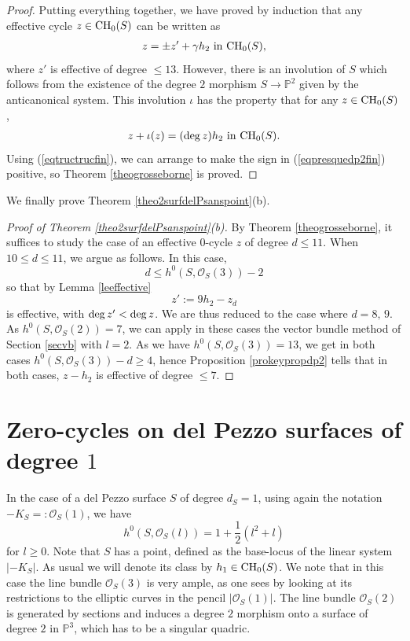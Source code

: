 \documentclass[10pt]{article}
\begin{document}
\begin{proof}
Putting everything together, we have proved  by induction that any effective cycle $z\in {\rm CH}_0(S)$ can be written
as
\begin{eqnarray}\label{eqpresquedp2fin} z=\pm z'+\gamma h_2\,\,{\rm in}\,\,{\rm CH}_0(S), \end{eqnarray} where $z'$ is effective of degree $\leq 13$. However, there is an involution of $S$ which follows from the existence of the  degree $2$  morphism  $S\rightarrow \mathbb{P}^2$ given by the anticanonical system. This  involution $\iota$ has the property that for any $z\in {\rm CH}_0(S)$,
\begin{eqnarray}\label{eqtructrucfin} z+\iota(z)=({\rm deg}\,z)h_2
\,\,{\rm in}\,\,{\rm CH}_0(S).
\end{eqnarray}
Using (\ref{eqtructrucfin}), we can arrange to make the sign in (\ref{eqpresquedp2fin}) positive, so
Theorem \ref{theogrosseborne} is proved.
\end{proof}

We finally prove Theorem \ref{theo2surfdelPsanspoint}(b).
\begin{proof}[Proof of Theorem \ref{theo2surfdelPsanspoint}(b)] By Theorem \ref{theogrosseborne}, it suffices to study the case of  an effective $0$-cycle $z$ of degree $d\leq 11$. When  $10\leq d\leq11$, we argue as follows. In this case,
$$d\leq h^0(S,\mathcal{O}_S(3))-2$$
so that by  Lemma \ref{leeffective}
$$ z':=9h_2-z_d$$
is effective, with ${\rm deg}\,z'<{\rm deg}\,z$. We are thus reduced to the case where $d=8,\,9$. As $h^0(S,\mathcal{O}_S(2))=7$, we can apply in these cases the vector bundle method of Section \ref{secvb} with $l=2$. As we have $h^0(S,\mathcal{O}_S(3))=13$, we get in both cases $h^0(S,\mathcal{O}_S(3))-d\geq 4$, hence Proposition \ref{prokeypropdp2} tells that in both cases, $z-h_2$ is effective of degree $\leq 7$.
\end{proof}



\section{Zero-cycles on del Pezzo surfaces of degree $1$ \label{secdelpezzodeg1}}
In the case of a del Pezzo surface $S$ of degree $d_S=1$, using again the notation $-K_S=:\mathcal{O}_S(1)$, we have
$$h^0(S,\mathcal{O}_S(l))=1+\frac{1}{2}(l^2+l)$$
for $l\geq 0$. Note that $S$ has a point, defined as the base-locus of the linear system $|-K_S|$. As usual we will denote its class by $h_1\in{\rm CH}_0(S)$.
We note that in this case the line bundle $\mathcal{O}_S(3)$ is  very ample, as one sees by looking at its restrictions to the elliptic curves in the pencil $|\mathcal{O}_S(1)|$. The line bundle $\mathcal{O}_S(2)$ is generated by sections and induces a degree $2$ morphism onto a surface of degree $2$  in $\mathbb{P}^3$, which has to be a singular quadric.
\end{document}
